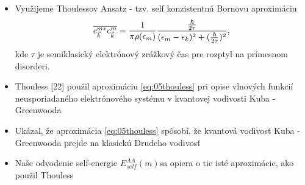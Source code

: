 \documentclass[
	11pt, %
]{beamer}
\begin{document}
\begin{frame}
\begin{itemize}
\item Využijeme Thoulessov Ansatz - tzv. self konzistentnú Bornovu aproximáciu
\begin{align}
\label{eq:05thouless}
\overline{c^{m*}_{\vec{k}}c^{m}_{\vec{k}}}=\frac{1}{\pi \rho(\epsilon_m)}\frac{\frac{\hbar}{2\tau}}{(\epsilon_m-\epsilon_{k})^2+(\frac{\hbar}{2\tau})^2} \text{,}
\end{align}
kde $\tau$ je semiklasický elektrónový zrážkový čas pre rozptyl na prímesnom disorderi. 
\item Thouless [22] použil aproximáciu \eqref{eq:05thouless} pri opise vlnových funkcií neusporiadaného elektrónového systému v kvantovej vodivosti Kuba - Greenwooda
\item Ukázal, že aproximácia \eqref{eq:05thouless} spôsobí, že kvantová vodivosť Kuba - Greenwooda prejde na klasickú Drudeho vodivosť
\item Naše odvodenie self-energie  $E_{self}^{AA}(m)$sa opiera o tie isté aproximácie, ako použil Thouless
\end{itemize}
\end{frame}
\end{document}
